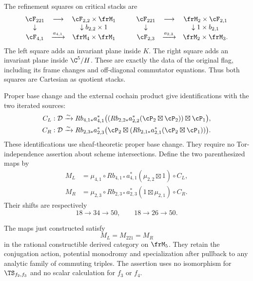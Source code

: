 The refinement squares on critical stacks are
\[
\begin{array}{ccc}
 \cF_{221}&\longrightarrow&\cF_{2,2}\times\frM_1\\
 \downarrow&&\downarrow b_{2,2}\times1\\
 \cF_{4,1}&\xrightarrow{a_{4,1}}&\frM_4\times\frM_1
\end{array}
 \qquad
\begin{array}{ccc}
 \cF_{221}&\longrightarrow&\frM_2\times\cF_{2,1}\\
 \downarrow&&\downarrow1\times b_{2,1}\\
 \cF_{2,3}&\xrightarrow{a_{2,3}}&\frM_2\times\frM_3.
\end{array}
\]
The left square adds an invariant plane inside $K$.
The right square adds an invariant plane inside $\C^5/H$.
These are exactly the data of the original flag, including its
frame changes and off-diagonal commutator equations. Thus both
squares are Cartesian as quotient stacks.

Proper base change and the external cochain product give
identifications with the two iterated sources:
\[
\begin{split}
 C_L:\mathcal D&\xrightarrow{\sim}
 Rb_{4,1*}a_{4,1}^*
  \bigl((Rb_{2,2*}a_{2,2}^*(\cP_2\boxtimes\cP_2))
                                      \boxtimes\cP_1\bigr),\\
 C_R:\mathcal D&\xrightarrow{\sim}
 Rb_{2,3*}a_{2,3}^*
  \bigl(\cP_2\boxtimes
       (Rb_{2,1*}a_{2,1}^*(\cP_2\boxtimes\cP_1))\bigr).
\end{split}
\]
These identifications use sheaf-theoretic proper base change. They
require no Tor-independence assertion about scheme intersections.
Define the two parenthesized maps by
\[
\begin{split}
 M_L&=\mu_{4,1}\circ
 Rb_{4,1*}a_{4,1}^*(\mu_{2,2}\boxtimes1)\circ C_L,\\
 M_R&=\mu_{2,3}\circ
 Rb_{2,3*}a_{2,3}^*(1\boxtimes\mu_{2,1})\circ C_R.
\end{split}
\]
Their shifts are respectively
\[
        18\longrightarrow34\longrightarrow50,
        \qquad18\longrightarrow26\longrightarrow50.
\]

\begin{theorem}
\label{fl221:thm:assoc}
The maps just constructed satisfy
\[
                         M_L=M_{221}=M_R
\]
in the rational constructible derived category on $\frM_5$.
They retain the conjugation action, potential monodromy and
specialization after pullback to any analytic family of commuting
triples. The assertion uses no isomorphism for
$\TS_{f_2,f_3}$ and no scalar calculation for $f_3$ or $f_4$.
\end{theorem}

